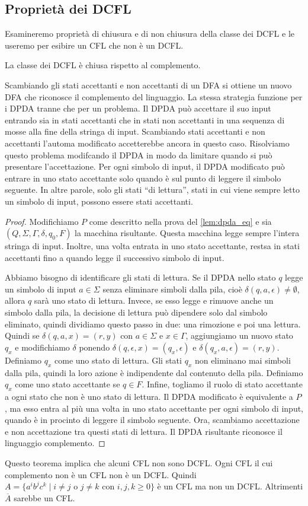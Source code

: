 \documentclass[12pt]{report}
\newcounter{theorem}
\begin{document}
\subsection{Proprietà dei DCFL}
Esamineremo proprietà di chiusura e di non chiusura della classe dei DCFL e le useremo per esibire un CFL che non è un DCFL.
\begin{theorem}{}{}
	La classe dei DCFL è chiusa rispetto al complemento.
\end{theorem}
Scambiando gli stati accettanti e non accettanti di un DFA si ottiene un nuovo DFA che riconosce il complemento del linguaggio. La stessa strategia funzione per i DPDA tranne che per un problema. Il DPDA può accettare il suo input entrando sia in stati accettanti che in stati non accettanti in una sequenza di mosse alla fine della stringa di input. Scambiando stati accettanti e non accettanti l'automa modificato accetterebbe ancora in questo caso. Risolviamo questo problema modifcando il DPDA in modo da limitare quando si può presentare l'accettazione. Per ogni simbolo di input, il DPDA modificato può entrare in uno stato accettante solo quando è sul punto di leggere il simbolo seguente. In altre parole, solo gli stati ``di lettura'', stati in cui viene sempre letto un simbolo di input, possono essere stati accettanti.
\begin{proof}
	Modifichiamo $P$ come descritto nella prova del \ref{lem:dpda_eq} e sia $(Q, \Sigma, \Gamma, \delta, q_0, F)$ la macchina risultante. Questa macchina legge sempre l'intera stringa di input. Inoltre, una volta entrata in uno stato accettante, restsa in stati accettanti fino a quando legge il successivo simbolo di input.

	Abbiamo bisogno di identificare gli stati di lettura. Se il DPDA nello stato $q$ legge un simbolo di input $a \in \Sigma$ senza eliminare simboli dalla pila, cioè $\delta(q, a, \epsilon) \neq \emptyset$, allora $q$ sarà uno stato di lettura. Invece, se esso legge e rimuove anche un simbolo dalla pila, la decisione di lettura può dipendere solo dal simbolo eliminato, quindi dividiamo questo passo in due: una rimozione e poi una lettura. Quindi se $\delta(q, a, x) = (r, y)$ con $a \in\Sigma$ e $x \in \Gamma$, aggiungiamo un nuovo stato $q_x$ e modifichiamo $\delta$ ponendo $\delta(q, \epsilon, x) = (q_x, \epsilon)$ e $\delta(q_x, a, \epsilon) = (r, y)$. Definiamo $q_x$ come uno stato di lettura. Gli stati $q_x$ non eliminano mai simboli dalla pila, quindi la loro azione è indipendente dal contenuto della pila. Definiamo $q_x$ come uno stato accettante se $q \in F$. Infine, togliamo il ruolo di stato accettante a ogni stato che non è uno stato di lettura. Il DPDA modificato è equivalente a  $P$, ma esso entra al più una volta in uno stato accettante per ogni simbolo di input, quando è in procinto di leggere il simbolo seguente. Ora, scambiamo accettazione e non accettazione tra questi stati di lettura. Il DPDA risultante riconosce il linguaggio complemento.
\end{proof}
Questo teorema implica che alcuni CFL non sono DCFL. Ogni CFL il cui complemento non è un CFL non è un DCFL. Quindi $A = \{a^ib^jc^k \mid  i\neq j \text{ o } j \neq k \text{ con } i,j,k \geq 0\}$ è un CFL ma non un DCFL. Altrimenti $\overline{A}$ sarebbe un CFL.
\end{document}
